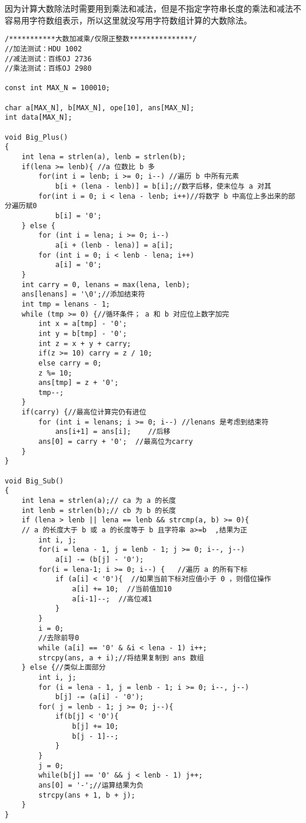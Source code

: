 因为计算大数除法时需要用到乘法和减法，但是不指定字符串长度的乘法和减法不容易用字符数组表示，所以这里就没写用字符数组计算的大数除法。
\begin{lstlisting}
/***********大数加减乘/仅限正整数***************/
//加法测试：HDU 1002
//减法测试：百练OJ 2736
//乘法测试：百练OJ 2980

const int MAX_N = 100010;

char a[MAX_N], b[MAX_N], ope[10], ans[MAX_N];
int data[MAX_N];

void Big_Plus()
{
    int lena = strlen(a), lenb = strlen(b);
    if(lena >= lenb){ //a 位数比 b 多
        for(int i = lenb; i >= 0; i--) //遍历 b 中所有元素
            b[i + (lena - lenb)] = b[i];//数字后移，使末位与 a 对其
        for(int i = 0; i < lena - lenb; i++)//将数字 b 中高位上多出来的部分遍历赋0
            b[i] = '0';
    } else {
        for (int i = lena; i >= 0; i--)
            a[i + (lenb - lena)] = a[i];
        for (int i = 0; i < lenb - lena; i++)
            a[i] = '0';
    }
    int carry = 0, lenans = max(lena, lenb);
    ans[lenans] = '\0';//添加结束符
    int tmp = lenans - 1;
    while (tmp >= 0) {//循环条件； a 和 b 对应位上数字加完
        int x = a[tmp] - '0';
        int y = b[tmp] - '0';
        int z = x + y + carry;
        if(z >= 10) carry = z / 10;
        else carry = 0;
        z %= 10;
        ans[tmp] = z + '0';
        tmp--;
    }
    if(carry) {//最高位计算完仍有进位
        for (int i = lenans; i >= 0; i--) //lenans 是考虑到结束符
            ans[i+1] = ans[i];    //后移
        ans[0] = carry + '0';  //最高位为carry
    }
}

void Big_Sub()
{
    int lena = strlen(a);// ca 为 a 的长度
    int lenb = strlen(b);// cb 为 b 的长度
    if (lena > lenb || lena == lenb && strcmp(a, b) >= 0){
    // a 的长度大于 b 或 a 的长度等于 b 且字符串 a>=b  ,结果为正
        int i, j;
        for(i = lena - 1, j = lenb - 1; j >= 0; i--, j--)
            a[i] -= (b[j] - '0');
        for(i = lena-1; i >= 0; i--) {   //遍历 a 的所有下标
            if (a[i] < '0'){  //如果当前下标对应值小于 0 ，则借位操作
                a[i] += 10;  //当前值加10
                a[i-1]--;  //高位减1
            }
        }
        i = 0;
        //去除前导0
        while (a[i] == '0' & &i < lena - 1) i++;
        strcpy(ans, a + i);//将结果复制到 ans 数组
    } else {//类似上面部分
        int i, j;
        for (i = lena - 1, j = lenb - 1; i >= 0; i--, j--)
            b[j] -= (a[i] - '0');
        for( j = lenb - 1; j >= 0; j--){
            if(b[j] < '0'){
                b[j] += 10;
                b[j - 1]--;
            }
        }
        j = 0;
        while(b[j] == '0' && j < lenb - 1) j++;
        ans[0] = '-';//运算结果为负
        strcpy(ans + 1, b + j);
    }
}


\end{lstlisting}
